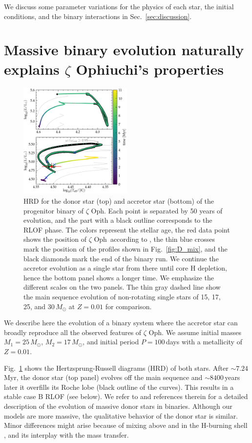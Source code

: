 \documentclass[twocolumn,twocolappendix,trackchanges]{aastex63}
\DeclareRobustCommand{\Figref}[1]{Fig.~\ref{#1}}
\DeclareRobustCommand{\Secref}[1]{Sec.~\ref{#1}}
\newcommand{\zoph}{$\zeta$ Oph}
\begin{document}
We discuss some parameter variations for the physics of each star, the
initial conditions, and the binary interactions in \Secref{sec:discussion}.

\section{Massive binary evolution naturally explains $\zeta$
  Ophiuchi's properties}
\label{sec:best_model}

\begin{figure}[bp]
  \includegraphics[width=0.5\textwidth]{HRD_both}
  \caption{HRD for the donor star (top) and accretor star (bottom) of
    the progenitor binary of \zoph. Each point is separated by 50
    years of evolution, and the part with a black outline corresponds
    to the RLOF phase. The colors represent the stellar age, the red
    data point shows the position of \zoph\ according to
    , the thin blue crosses mark the
    position of the profiles shown in \Figref{fig:D_mix}, and the
    black diamonds mark the end of the binary run. We
    continue the accretor evolution as a single star from there until
    core H depletion, hence the bottom panel shows a longer time. We
    emphasize the different scales on the two panels. The thin gray
    dashed line show the main sequence evolution of non-rotating
    single stars of 15, 17, 25, and 30\,$M_\odot$ at $Z=0.01$ for
    comparison.}
  \label{fig:HRD_both}
\end{figure}


We describe here the evolution of a binary system where the accretor
star can broadly reproduce all the observed features of \zoph. We
assume initial masses $M_1=25\,M_\odot$, $M_2=17\,M_\odot$, and initial
period $P=100$\,days with a metallicity of $Z=0.01$.

\Figref{fig:HRD_both} shows the Hertzsprung-Russell diagrams (HRD) of
both stars. After
$\sim$$7.24$\,Myr, the donor star (top panel) evolves off the main sequence and
$\sim8400$\,years later it overfills its Roche lobe (black outline of the curves). This results in a stable case B RLOF (see below). We refer to \cite{gotberg:17, klencki:20, laplace:21, blagorodnova:21} and references therein for a detailed description of the evolution of massive donor stars in binaries. Although our models are more massive, the qualitative behavior of the donor star is similar. Minor differences might arise because of mixing above and in the H-burning shell \citep[e.g.,][]{schootemeijer:19, klencki:21}, and its interplay with the mass transfer.
\end{document}
